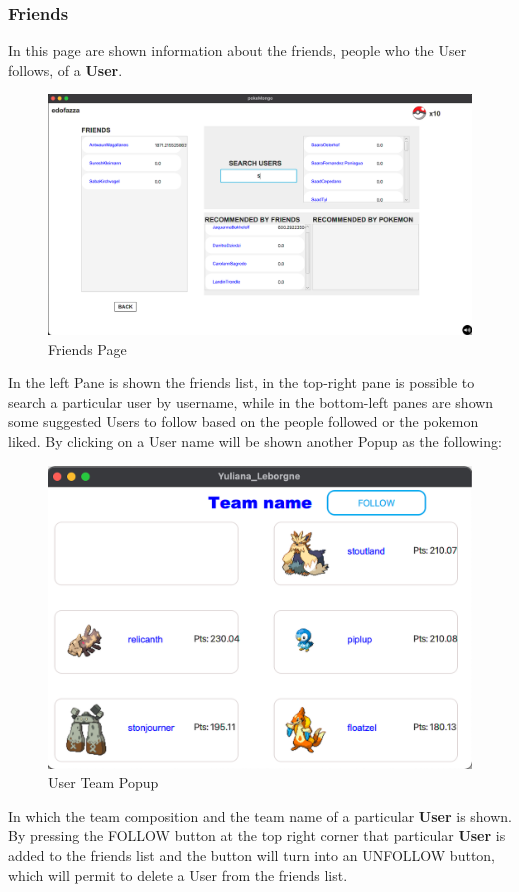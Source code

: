\subsubsection{Friends}
In this page are shown information about the friends, people who the User follows, of a \textbf{User}. 
\begin{figure}[H]
	\centering
	\includegraphics[width=\textwidth]{img/userManual/friends.png}
	\caption{Friends Page}
\end{figure}
In the left Pane is shown the friends list, in the top-right pane is possible to search a particular user by username, while in the bottom-left panes are shown some suggested Users to follow based on the people followed or the pokemon liked.
By clicking on a User name will be shown another Popup as the following:
\begin{figure}[H]
	\centering
	\includegraphics[width=\textwidth]{img/userManual/team_popup.png}
	\caption{User Team Popup}
\end{figure}
In which the team composition and the team name of a particular \textbf{User} is shown. By pressing the FOLLOW button at the top right corner that particular \textbf{User} is added to the friends list and the button will turn into an UNFOLLOW button, which will permit to delete a User from the friends list.

